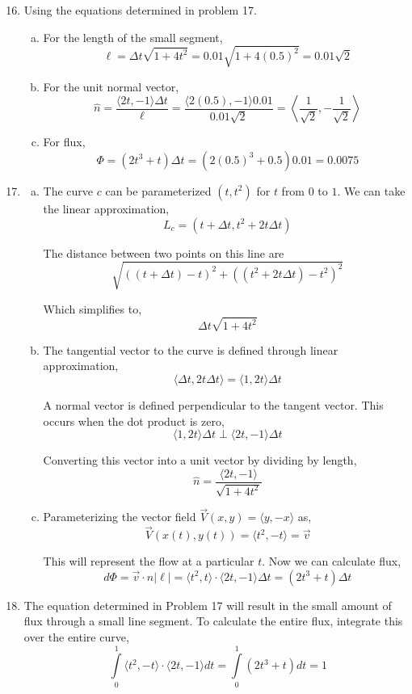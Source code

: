 \documentclass{article}
\begin{document}
\begin{enumerate}[1.]
  \setcounter{enumi}{15}
  \item Using the equations determined in problem 17.
    \begin{enumerate}[a.]
      \item For the length of the small segment,
        $$ \ell = \Delta t \sqrt{1 + 4t^{2}} = 0.01 \sqrt{1 +
        4(0.5)^{2}} = 0.01\sqrt{2}$$
      \item For the unit normal vector,
        $$ \hat{n} = \frac{ \langle 2t, -1 \rangle \Delta t}{ \ell } = \frac{
        \langle 2 (0.5), -1 \rangle 0.01 }{ 0.01 \sqrt{2} } = \left\langle
        \frac{ 1 }{ \sqrt{2} }, -\frac{ 1 }{ \sqrt{2} } \right\rangle$$
      \item For flux,
        $$ \Phi = (2 t^{3} + t) \Delta t = (2(0.5)^{3} + 0.5) 0.01 = 0.0075 $$
    \end{enumerate}
  \item \begin{enumerate}[a.]
    \item The curve $c$ can be parameterized $(t, t^{2})$ for $t$ from $0$ to
      $1$. We can take the linear approximation,
      $$ L_{c} = (t + \Delta t, t^{2} + 2t \Delta t) $$

      The distance between two points on this line are
      $$ \sqrt{((t + \Delta t) - t)^{2} + ((t^{2} + 2t\Delta t) - t^{2})^{2}} $$

      Which simplifies to,
      $$ \Delta t \sqrt{1 + 4t^{2}} $$
    \item The tangential vector to the curve is defined through linear
      approximation,
      $$ \langle \Delta t, 2t \Delta t \rangle = \langle 1, 2t \rangle \Delta t $$

      A normal vector is defined perpendicular to the tangent vector. This
      occurs when the dot product is zero,
      $$ \langle 1, 2t \rangle \Delta t \perp \langle 2t, -1 \rangle \Delta t $$

      Converting this vector into a unit vector by dividing by length,
      $$ \hat{n} = \frac{ \langle 2t, -1 \rangle }{ \sqrt{1 + 4t^{2}} } $$

    \item Parameterizing the vector field $\vec{V}(x, y) = \langle y, -x
      \rangle$ as,
      $$ \vec{V}(x(t), y(t)) = \langle t^{2}, -t \rangle = \vec{v}$$

      This will represent the flow at a particular $t$. Now we can calculate
      flux,
      $$ d\Phi = \vec{v} \cdot \hat{n} \vert \ell \vert = \langle t^{2}, t
      \rangle \cdot \langle 2t, -1 \rangle \Delta t = (2t^{3} + t) \Delta t$$
  \end{enumerate}

\item The equation determined in Problem 17 will result in the small amount of
  flux through a small line segment. To calculate the entire flux, integrate
  this over the entire curve,
$$ \int\limits_0^{1} \langle t^{2}, -t \rangle \cdot \langle 2t, -1 \rangle dt =
\int\limits_{0}^{1} (2t^{3} + t)dt = 1$$
\end{enumerate}
\end{document}
